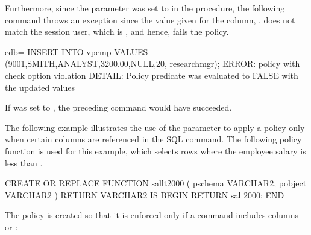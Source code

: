 \documentclass[letterpaper,10pt,english,openany,oneside]{sphinxmanual}
\begin{document}
Furthermore, since the  parameter was set to  in the
 procedure, the following  command throws an exception
since the value given for the  column, , does not match
the session user, which is , and hence, fails the policy.

%
\begin{sphinxVerbatim}[commandchars=\\\{\}]
edb=\PYGZgt{} INSERT INTO vpemp VALUES (9001,\PYGZsq{}SMITH\PYGZsq{},\PYGZsq{}ANALYST\PYGZsq{},3200.00,NULL,20, \PYGZsq{}researchmgr\PYGZsq{});
ERROR:  policy with check option violation
DETAIL:  Policy predicate was evaluated to FALSE with the updated values
\end{sphinxVerbatim}

If  was set to , the preceding  command would
have succeeded.

The following example illustrates the use of the 
parameter to apply a policy only when certain columns are referenced in
the SQL command. The following policy function is used for this example,
which selects rows where the employee salary is less than .

%
\begin{sphinxVerbatim}[commandchars=\\\{\}]
CREATE OR REPLACE FUNCTION sal\PYGZus{}lt\PYGZus{}2000 (
    p\PYGZus{}schema        VARCHAR2,
    p\PYGZus{}object        VARCHAR2
)
RETURN VARCHAR2
IS
BEGIN
    RETURN \PYGZsq{}sal \PYGZlt{} 2000\PYGZsq{};
END
\end{sphinxVerbatim}

\newpage

The policy is created so that it is enforced only if a  command
includes columns  or :
\end{document}
